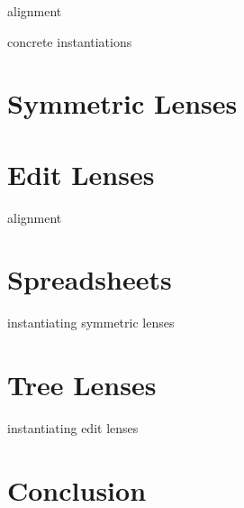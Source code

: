\documentclass[12pt]{report}
\numberwithin{equation}{section}
\begin{document}
alignment

concrete instantiations

\chapter{Symmetric Lenses}



\chapter{Edit Lenses}

alignment

\chapter{Spreadsheets}

instantiating symmetric lenses

\chapter{Tree Lenses}

instantiating edit lenses
% 

\chapter{Conclusion}

%
\end{document}
